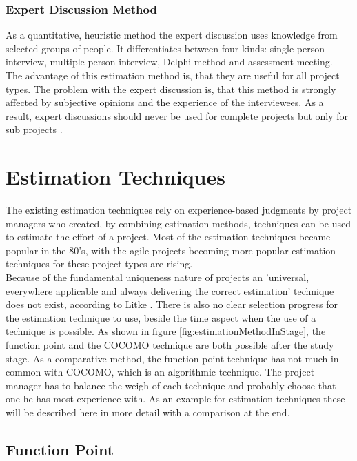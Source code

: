 \subsubsection{Expert Discussion Method}

As a quantitative, heuristic method the expert discussion uses knowledge from selected groups of people. It differentiates between four kinds: single person interview, multiple person interview, Delphi method and assessment meeting.\\
The advantage of this estimation method is, that they are useful for all project types. The problem with the expert discussion is, that this method is strongly affected by subjective opinions and the experience of the interviewees. As a result, expert discussions should never be used for complete projects but only for sub projects \cite{itplanung}.\\

\section{Estimation Techniques}

The existing estimation techniques rely on experience-based judgments by project managers
who created, by combining estimation methods, techniques can be used to estimate the effort of a project. Most of the estimation techniques became popular in the 80's, with the agile projects becoming more popular estimation techniques for these project types are rising. \\
Because of the fundamental uniqueness nature of projects an 'universal, everywhere applicable and always delivering the correct estimation' technique does not exist, according to Litke \cite{litke}. There is also no clear selection progress for the estimation technique to use, beside the time aspect when the use of a technique is possible. As shown in figure \ref{fig:estimationMethodInStage}, the function point and the COCOMO technique are both possible after the study stage. As a comparative method, the function point technique has not much in common with COCOMO, which is an algorithmic technique. The project manager has to balance the weigh of each technique and probably choose that one he has most experience with. As an example for estimation techniques these will be described here in more detail with a comparison at the end.


\subsection{Function Point} \label{FPMethod}

